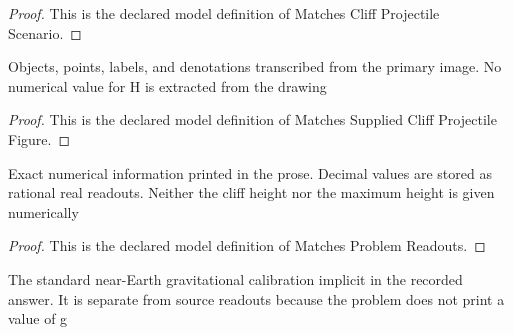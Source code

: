\begin{proof}
  This is the declared model definition of Matches Cliff Projectile Scenario.
\end{proof}
\begin{definition}
  \label{def:physics:phyx-mini-0739:phyxminiproblems-problemphyxmini0739-matchessuppliedcliffprojectilefigure}
  Objects, points, labels, and denotations transcribed from the primary image. No numerical value for H is extracted from the drawing
\end{definition}
\begin{proof}
  This is the declared model definition of Matches Supplied Cliff Projectile Figure.
\end{proof}
\begin{definition}
  \label{def:physics:phyx-mini-0739:phyxminiproblems-problemphyxmini0739-matchesproblemreadouts}
  Exact numerical information printed in the prose. Decimal values are stored as rational real readouts. Neither the cliff height nor the maximum height is given numerically
\end{definition}
\begin{proof}
  This is the declared model definition of Matches Problem Readouts.
\end{proof}
\begin{definition}
  \label{def:physics:phyx-mini-0739:phyxminiproblems-problemphyxmini0739-usesstandardnearearthgravity}
  The standard near-Earth gravitational calibration implicit in the recorded answer. It is separate from source readouts because the problem does not print a value of g
\end{definition}
